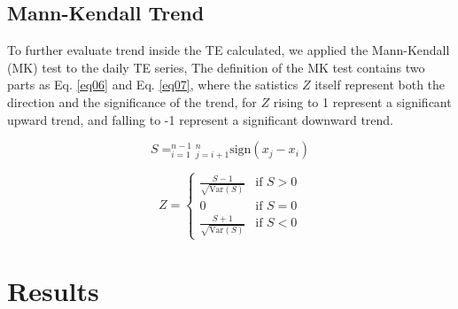 \documentclass{elsarticle}
\def\sum{}%
\begin{document}
\subsection{Mann-Kendall Trend}
To further evaluate trend inside the TE calculated, we applied the Mann-Kendall (MK) test to the daily TE series, The definition of the MK test contains two parts as Eq. \ref{eq06} and Eq. \ref{eq07}, where the satistics $Z$ itself represent both the direction and the significance of the trend, for $Z$ rising to 1 represent a significant upward trend, and falling to -1 represent a significant downward trend.

\begin{equation} \label{eq07}
S = \sum_{i=1}^{n-1} \sum_{j=i+1}^{n} \text{sign}(x_j - x_i)
\end{equation}

\begin{equation} \label{eq08}
Z = 
\begin{cases}
\frac{S - 1}{\sqrt{\text{Var}(S)}} & \text{if } S > 0 \\
0 & \text{if } S = 0 \\
\frac{S + 1}{\sqrt{\text{Var}(S)}} & \text{if } S < 0
\end{cases}
\end{equation}
\section{Results}
\end{document}
